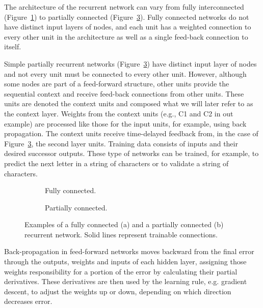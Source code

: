 The architecture of the recurrent network can vary from fully interconnected (Figure~\ref{fig:fullyconnected}) to partially connected (Figure~\ref{fig:partiallyconnected}). Fully connected networks do not have distinct input layers of nodes, and each unit has a weighted connection to every other unit in the architecture as well as a single feed-back connection to itself.

Simple partially recurrent networks (Figure~\ref{fig:partiallyconnected}) have distinct input layer of nodes and not every unit must be connected to every other unit. However, although some nodes are part of a feed-forward structure, other units provide the sequential context and receive feed-back connections from other units. These units are denoted the context units and composed what we will later refer to as the context layer. Weights from the context units (e.g., C1 and C2 in out example) are processed like those for the input units, for example, using back propagation. The context units receive time-delayed feedback from, in the case of Figure~\ref{fig:partiallyconnected}, the second layer units. Training data consists of inputs and their desired successor outputs. These type of networks can be trained, for example, to predict the next letter in a string of characters or to validate a string of characters.

\begin{figure}
	\centering
	\begin{subfigure}[b]{0.7\textwidth}
		\centering
		\scalebox{1.0}{\fullyconnected} 
		\bigskip
		\caption{\label{fig:fullyconnected} Fully connected.}
	\end{subfigure}
	\par\bigskip\par\bigskip\par\bigskip
	\begin{subfigure}[b]{0.7\textwidth}
		\centering
		\scalebox{1.0}{\partiallyconnected} 
		\bigskip
		\caption{\label{fig:partiallyconnected} Partially connected.}
	\end{subfigure}
	\par\bigskip
	\caption{Examples of a fully connected (a) and a partially connected (b) recurrent network. Solid lines represent trainable connections.}
\end{figure}

Back-propagation in feed-forward networks moves backward from the final error through the outputs, weights and inputs of each hidden layer, assigning those weights responsibility for a portion of the error by calculating their partial derivatives. These derivatives are then used by the learning rule, e.g. gradient descent, to adjust the weights up or down, depending on which direction decreases error.

